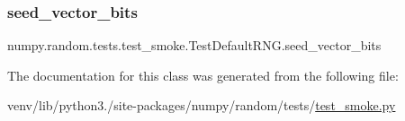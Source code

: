 \subsubsection{\texorpdfstring{seed\+\_\+vector\+\_\+bits}{seed\_vector\_bits}}
{\footnotesize\ttfamily numpy.\+random.\+tests.\+test\+\_\+smoke.\+Test\+Default\+R\+N\+G.\+seed\+\_\+vector\+\_\+bits}



The documentation for this class was generated from the following file\+:\begin{DoxyCompactItemize}
\item 
venv/lib/python3./site-\/packages/numpy/random/tests/\hyperlink{test__smoke_8py}{test\+\_\+smoke.\+py}\end{DoxyCompactItemize}
